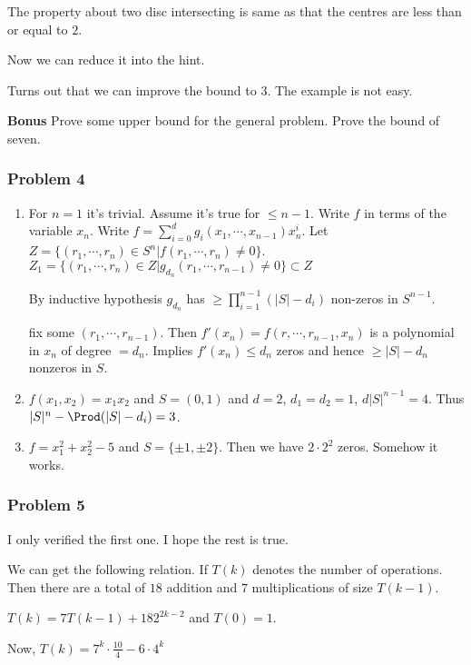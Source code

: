 \documentclass[11pt]{article}
\begin{document}
The property about two disc intersecting is same as that the centres are
less than or equal to \(2\).

Now we can reduce it into the hint. 

Turns out that we can improve the bound to \(3\). The example is not easy.

\textbf{Bonus} Prove some upper bound for the general problem. Prove the bound of
 seven.
\subsubsection{Problem 4}
\label{sec:org1bdbb48}
\begin{enumerate}
\item For \(n =1\) it's trivial. Assume it's true for \(\le n- 1\). Write \(f\) in
terms of the variable \(x_n\). Write \(f = \sum_{i = 0}^{d} g_i(x_1, \cdots,
       x_{n-1}) x_n^i\). Let \(Z = \{(r_1, \cdots, r_n) \in S^n \vert f(r_1,
       \cdots, r_n) \neq 0\}\). \(Z_1 = \{(r_1, \cdots, r_n) \in Z \vert
       g_d_n(r_1, \cdots, r_{n-1}) \neq 0\} \subset Z\)

By inductive hypothesis \(g_{d_n}\) has \(\ge \prod_{i=1}^{n-1} (\vert S
       \vert - d_i)\) non-zeros in \(S^{n-1}\).

fix some \((r_1, \cdots, r_{n-1})\). Then \(f'(x_n) = f(r, \cdots, r_{n-1},
       x_n)\) is a polynomial in \(x_n\) of degree \(=d_n\). Implies \(f'(x_n) \le
       d_n\) zeros and hence \(\ge \vert S \vert - d_n\) nonzeros in \(S\).
\item \(f(x_1, x_2) = x_1x_2\) and \(S = (0, 1)\) and \(d = 2\), \(d_1 = d_2 = 1\),
\(d\vert S \vert^{n-1} = 4\). Thus \(\vert S \vert^n - \Prod (\vert S
       \vert - d_i) =3\).
\item \(f = x_1^2 + x_2^2 - 5\) and \(S = \{\pm 1, \pm 2\}\). Then we have \(2 \cdot
       2^2\) zeros. Somehow it works.
\end{enumerate}
\subsubsection{Problem 5}
\label{sec:org5425b9d}
I only verified the first one. I hope the rest is true.

We can get the following relation. If \(T(k)\) denotes the number of
operations. Then there are a total of \(18\) addition and \(7\) multiplications
of size \(T(k-1)\).

\(T(k) = 7T(k-1) + 18 2^{2k-2}\) and \(T(0) = 1\).

Now, \(T(k) = 7^k \cdot\frac{10}{4} - 6 \cdot 4^k\)
\end{document}
